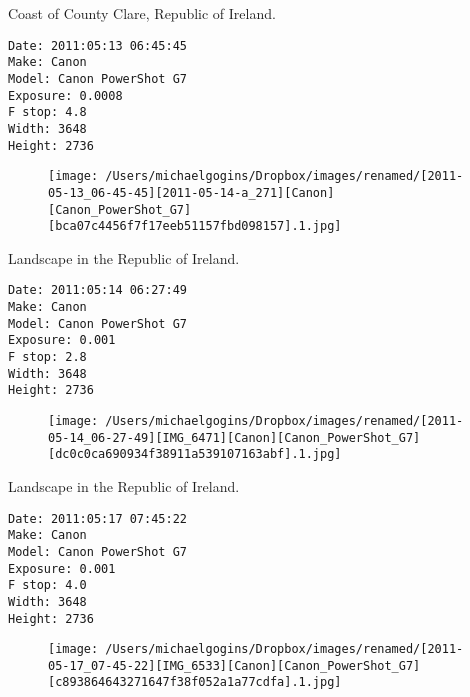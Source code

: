 \documentclass[11pt,letter,DIV=14,paper=landscape]{scrbook}
\begin{document}
\clearpage
\noindent Coast of County Clare, Republic of Ireland.
\noindent
\begin{lstlisting}
Date: 2011:05:13 06:45:45
Make: Canon
Model: Canon PowerShot G7
Exposure: 0.0008
F stop: 4.8
Width: 3648
Height: 2736
\end{lstlisting}
\clearpage

\begin{figure}
\texttt{[image: /Users/michaelgogins/Dropbox/images/renamed/[2011-05-13\_06-45-45][2011-05-14-a\_271][Canon][Canon\_PowerShot\_G7][bca07c4456f7f17eeb51157fbd098157].1.jpg]}
\end{figure}
    
\clearpage
\noindent Landscape in the Republic of Ireland.
\noindent
\begin{lstlisting}
Date: 2011:05:14 06:27:49
Make: Canon
Model: Canon PowerShot G7
Exposure: 0.001
F stop: 2.8
Width: 3648
Height: 2736
\end{lstlisting}
\clearpage

\begin{figure}
\texttt{[image: /Users/michaelgogins/Dropbox/images/renamed/[2011-05-14\_06-27-49][IMG\_6471][Canon][Canon\_PowerShot\_G7][dc0c0ca690934f38911a539107163abf].1.jpg]}
\end{figure}
    
\clearpage
\noindent Landscape in the Republic of Ireland.
\noindent
\begin{lstlisting}
Date: 2011:05:17 07:45:22
Make: Canon
Model: Canon PowerShot G7
Exposure: 0.001
F stop: 4.0
Width: 3648
Height: 2736
\end{lstlisting}
\clearpage

\begin{figure}
\texttt{[image: /Users/michaelgogins/Dropbox/images/renamed/[2011-05-17\_07-45-22][IMG\_6533][Canon][Canon\_PowerShot\_G7][c893864643271647f38f052a1a77cdfa].1.jpg]}
\end{figure}
    
\end{document}

